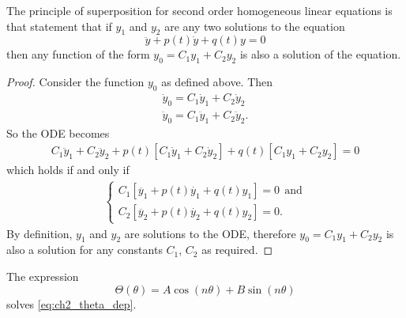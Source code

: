 \begin{thm}The principle of superposition for second order homogeneous linear equations is that statement that if $y_1$ and $y_2$ are any two solutions to the equation
  \[ \ddot{y} + p(t)\dot{y} + q(t)y =  0\]
  then any function of the form
  $ y_0 = C_1 y_1 + C_2 y_2 $
  is also a solution of the equation.
\end{thm}
\begin{proof}
  Consider the function $y_0$ as defined above. Then
  \begin{gather*}
    \dot{y}_0 = C_1 \dot{y}_1 + C_2 \dot{y}_2 \\
    \ddot{y}_0 = C_1 \ddot{y}_1 + C_2 \ddot{y}_2.
  \end{gather*}
  So the ODE becomes
  \begin{gather*}
    C_1 \ddot{y}_1 + C_2 \ddot{y}_2 + p(t) [ C_1 \dot{y}_1 + C_2 \dot{y}_2 ] + q(t) [C_1 y_1 + C_2 y_2] = 0
  \end{gather*}
  which holds if and only if
  \begin{gather*}
    \left\{
    \begin{array}{l}
      C_1[\ddot{y_1} + p(t)\dot{y_1} + q(t)y_1] =  0 ~~\text{and}\\
      C_2[\ddot{y_2} + p(t)\dot{y_2} + q(t)y_2] =  0.
    \end{array}
    \right.
  \end{gather*}
  By definition, $y_1$ and $y_2$ are solutions to the ODE, therefore $ y_0 = C_1 y_1 + C_2 y_2 $ is also a solution for any constants $C_1$, $C_2$ as required.
\end{proof}
\begin{propn}
  The expression
  \[
  \Theta(\theta) = A \cos(n\theta) + B \sin(n\theta)
  \]
  solves \eqref{eq:ch2_theta_dep}.
\end{propn}
